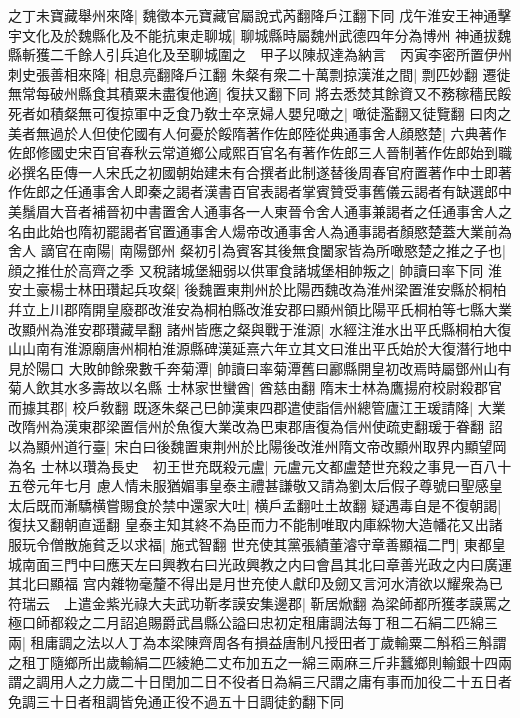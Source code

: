 之丁未寶藏舉州來降|{
	魏徵本元寶藏官屬說式芮翻降戶江翻下同}
戊午淮安王神通擊宇文化及於魏縣化及不能抗東走聊城|{
	聊城縣時屬魏州武德四年分為博州}
神通拔魏縣斬獲二千餘人引兵追化及至聊城圍之　甲子以陳叔達為納言　丙寅李密所置伊州刺史張善相來降|{
	相息亮翻降戶江翻}
朱粲有衆二十萬剽掠漢淮之間|{
	剽匹妙翻}
遷徙無常每破州縣食其積粟未盡復他適|{
	復扶又翻下同}
將去悉焚其餘資又不務稼穡民餒死者如積粲無可復掠軍中乏食乃敎士卒烹婦人嬰兒噉之|{
	噉徒濫翻又徒覽翻}
曰肉之美者無過於人但使佗國有人何憂於餒隋著作佐郎陸從典通事舍人顔愍楚|{
	六典著作佐郎修國史宋百官春秋云常道鄉公咸熙百官名有著作佐郎三人晉制著作佐郎始到職必撰名臣傳一人宋氏之初國朝始建未有合撰者此制遂替後周春官府置著作中士即著作佐郎之任通事舍人即秦之謁者漢書百官表謁者掌賓贊受事舊儀云謁者有缺選郎中美鬚眉大音者補晉初中書置舍人通事各一人東晉令舍人通事兼謁者之任通事舍人之名由此始也隋初罷謁者官置通事舍人煬帝改通事舍人為通事謁者顏愍楚蓋大業前為舍人}
謫官在南陽|{
	南陽鄧州}
粲初引為賓客其後無食闔家皆為所噉愍楚之推之子也|{
	顔之推仕於高齊之季}
又稅諸城堡細弱以供軍食諸城堡相帥叛之|{
	帥讀曰率下同}
淮安土豪楊士林田瓚起兵攻粲|{
	後魏置東荆州於比陽西魏改為淮州梁置淮安縣於桐柏幷立上川郡隋開皇廢郡改淮安為桐柏縣改淮安郡曰顯州領比陽平氏桐柏等七縣大業改顯州為淮安郡瓚藏旱翻}
諸州皆應之粲與戰于淮源|{
	水經注淮水出平氏縣桐柏大復山山南有淮源廟唐州桐柏淮源縣碑漢延熹六年立其文曰淮出平氏始於大復潛行地中見於陽口}
大敗帥餘衆數千奔菊潭|{
	帥讀曰率菊潭舊曰酈縣開皇初改焉時屬鄧州山有菊人飲其水多壽故以名縣}
士林家世蠻酋|{
	酋慈由翻}
隋末士林為鷹揚府校尉殺郡官而據其郡|{
	校戶敎翻}
既逐朱粲己巳帥漢東四郡遣使詣信州總管廬江王瑗請降|{
	大業改隋州為漢東郡梁置信州於魚復大業改為巴東郡唐復為信州使疏吏翻瑗于眷翻}
詔以為顯州道行臺|{
	宋白曰後魏置東荆州於比陽後改淮州隋文帝改顯州取界内顯望岡為名}
士林以瓚為長史　初王世充既殺元盧|{
	元盧元文都盧楚世充殺之事見一百八十五卷元年七月}
慮人情未服猶媚事皇泰主禮甚謙敬又請為劉太后假子尊號曰聖感皇太后既而漸驕横嘗賜食於禁中還家大吐|{
	横戶孟翻吐土故翻}
疑遇毒自是不復朝謁|{
	復扶又翻朝直遥翻}
皇泰主知其終不為臣而力不能制唯取内庫綵物大造幡花又出諸服玩令僧散施貧乏以求福|{
	施式智翻}
世充使其黨張績董濬守章善顯福二門|{
	東都皇城南面三門中曰應天左曰興教右曰光政興教之内曰會昌其北曰章善光政之内曰廣運其北曰顯福}
宫内雜物毫釐不得出是月世充使人獻印及劒又言河水清欲以耀衆為已符瑞云　上遣金紫光祿大夫武功靳孝謨安集邊郡|{
	靳居焮翻}
為梁師都所獲孝謨罵之極口師都殺之二月詔追賜爵武昌縣公謚曰忠初定租庸調法每丁租二石絹二匹綿三兩|{
	租庸調之法以人丁為本梁陳齊周各有損益唐制凡授田者丁歲輸粟二斛稻三斛謂之租丁隨鄉所出歲輸絹二匹綾絶二丈布加五之一綿三兩麻三斤非蠶鄉則輸銀十四兩謂之調用人之力歲二十日閏加二日不役者日為絹三尺謂之庸有事而加役二十五日者免調三十日者租調皆免通正役不過五十日調徒釣翻下同}
